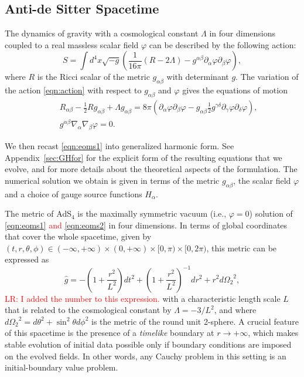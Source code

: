 \documentclass[a4paper,11pt]{article}
\numberwithin{equation}{section}
\begin{document}
\subsection{Anti-de Sitter Spacetime}\label{subsec:AdS}
The dynamics of gravity with a cosmological constant $\Lambda$ in four dimensions coupled to a real massless scalar field $\varphi$ can be described by the following action:
\begin{equation}\label{eqn:action}
S = \int d^4 x \sqrt{-g} \left( \frac{1}{16\pi} \left( R - 2\Lambda \right) - g^{\alpha\beta} \partial_\alpha \varphi \partial_\beta \varphi \right) ,
\end{equation}
where $R$ is the Ricci scalar of the metric $g_{\alpha\beta}$ with determinant $g$.
The variation of the action \eqref{eqn:action} with respect to $g_{\alpha\beta}$ and $\varphi$ gives the equations of motion
\begin{eqnarray}
\label{eqn:eoms1}
&&R_{\alpha\beta} - \frac{1}{2} R g_{\alpha\beta} + \Lambda g_{\alpha\beta} = 8\pi \left( \partial_\alpha \varphi \partial_\beta \varphi - g_{\alpha\beta} \frac{1}{2} g^{\gamma\delta} \partial_{\gamma} \varphi \partial_{\delta} \varphi \right),\\
\label{eqn:eoms2}
&&g^{\alpha\beta} \nabla_{\alpha} \nabla_{\beta} \varphi = 0.
\end{eqnarray}

We then recast \eqref{eqn:eoms1} into generalized harmonic form.
See Appendix~\ref{sec:GHfor} for the explicit form of the resulting equations that we evolve, and \cite{Pretorius:2004jg} for more details about the theoretical aspects of the formulation.
The numerical solution we obtain is given 
in terms of the metric $g_{\alpha\beta}$, the scalar field $\varphi$ and a  choice of gauge source functions $H_\alpha$. 

The metric of AdS$_4$ is the maximally symmetric vacuum (i.e., $\varphi=0$) solution of \eqref{eqn:eoms1} \textcolor{red}{and} \eqref{eqn:eoms2} in four dimensions.
In terms of global coordinates that cover the whole spacetime, given by $(t,r,\theta,\phi)\in(-\infty,+\infty)\times(0,+\infty)\times[0,\pi)\times[0,2\pi)$, this metric can be expressed as
\begin{equation}\label{eqn:ads4}
\hat{g}= -\left(1+\frac{r^2}{L^2}\right) dt^2 + \left(1+\frac{r^2}{L^2}\right)^{-1} dr^2 +r^2 d{\Omega_2}^2 ,
\end{equation}
\textcolor{red}{LR: I added the number to this expression.}
with a characteristic length scale $L$ that is related to the cosmological constant by $\Lambda = - 3/L^2$, and where $d{\Omega_2}^2 = d\theta^2 + \sin^2\theta d\phi^2$ is the metric of the round unit 2-sphere. 
A crucial feature of this spacetime is the presence of a \emph{timelike} boundary at $r \rightarrow +\infty$, which makes stable evolution of initial data possible only if boundary conditions are imposed on the evolved fields. 
In other words, any Cauchy problem in this setting is an initial-boundary value problem.
\end{document}
